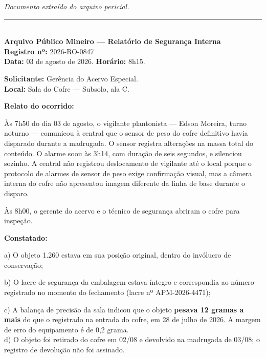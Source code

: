 
\noindent \textit{Documento extraído do arquivo pericial.}

\vspace{0.5em}\noindent\rule{\textwidth}{0.5pt}\vspace{0.5em}

\\[-0.2em]

\noindent \textbf{Arquivo Público Mineiro --- Relatório de Segurança Interna}\\
\noindent \textbf{Registro nº:} 2026-RO-0847\\
\noindent\textbf{Data:} 03 de agosto de 2026. \textbf{Horário:} 8h15.

\noindent \textbf{Solicitante:} Gerência do Acervo Especial.\\
\noindent \textbf{Local:} Sala do Cofre --- Subsolo, ala C.

\noindent \textbf{Relato do ocorrido:}

\noindent Às 7h50 do dia 03 de agosto, o vigilante plantonista --- Edson Moreira, turno noturno --- comunicou à central que o sensor de peso do cofre definitivo havia disparado durante a madrugada. O sensor registra alterações na massa total do conteúdo. O alarme soou às 3h14, com duração de seis segundos, e silenciou sozinho. A central não registrou deslocamento de vigilante até o local porque o protocolo de alarmes de sensor de peso exige confirmação visual, mas a câmera interna do cofre não apresentou imagem diferente da linha de base durante o disparo.

\noindent Às 8h00, o gerente do acervo e o técnico de segurança abriram o cofre para inspeção.

\noindent \textbf{Constatado:}

\noindent a) O objeto 1.260 estava em sua posição original, dentro do invólucro de conservação;

\noindent b) O lacre de segurança da embalagem estava íntegro e correspondia ao número registrado no momento do fechamento (lacre nº APM-2026-4471);

\noindent c) A balança de precisão da sala indicou que o objeto \textbf{pesava 12 gramas a mais} do que o registrado na entrada do cofre, em 28 de julho de 2026. A margem de erro do equipamento é de 0,2 grama.\\
\noindent d) O objeto foi retirado do cofre em 02/08 e devolvido na madrugada de 03/08; o registro de devolução não foi assinado.

